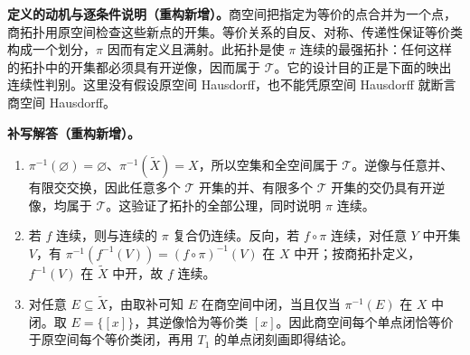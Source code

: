 \documentclass[../../main.tex]{subfiles}%
\begin{document}
\begin{remark}
\textbf{定义的动机与逐条件说明（重构新增）。}商空间把指定为等价的点合并为一个点，商拓扑用原空间检查这些新点的开集。等价关系的自反、对称、传递性保证等价类构成一个划分，$\pi$ 因而有定义且满射。此拓扑是使 $\pi$ 连续的最强拓扑：任何这样的拓扑中的开集都必须具有开逆像，因而属于 $\mathcal T$。它的设计目的正是下面的映出连续性判别。这里没有假设原空间 Hausdorff，也不能凭原空间 Hausdorff 就断言商空间 Hausdorff。
\end{remark}
\begin{solution}
\textbf{补写解答（重构新增）。}
\begin{enumerate}
\item $\pi^{-1}(\varnothing)=\varnothing$、$\pi^{-1}(\widetilde X)=X$，所以空集和全空间属于 $\mathcal T$。逆像与任意并、有限交交换，因此任意多个 $\mathcal T$ 开集的并、有限多个 $\mathcal T$ 开集的交仍具有开逆像，均属于 $\mathcal T$。这验证了拓扑的全部公理，同时说明 $\pi$ 连续。
\item 若 $f$ 连续，则与连续的 $\pi$ 复合仍连续。反向，若 $f\circ\pi$ 连续，对任意 $Y$ 中开集 $V$，有 $\pi^{-1}(f^{-1}(V))=(f\circ\pi)^{-1}(V)$ 在 $X$ 中开；按商拓扑定义，$f^{-1}(V)$ 在 $\widetilde X$ 中开，故 $f$ 连续。
\item 对任意 $E\subseteq\widetilde X$，由取补可知 $E$ 在商空间中闭，当且仅当 $\pi^{-1}(E)$ 在 $X$ 中闭。取 $E=\{[x]\}$，其逆像恰为等价类 $[x]$。因此商空间每个单点闭恰等价于原空间每个等价类闭，再用 $T_1$ 的单点闭刻画即得结论。
\end{enumerate}
\end{solution}
\end{document}
